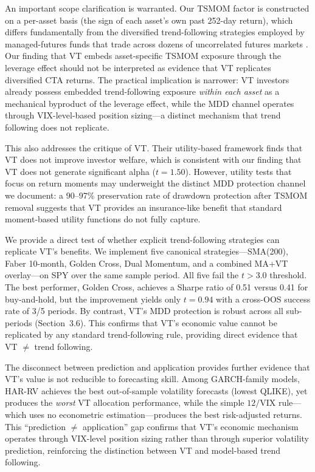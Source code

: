 An important scope clarification is warranted. Our TSMOM factor is constructed on a per-asset basis (the sign of each asset's own past 252-day return), which differs fundamentally from the diversified trend-following strategies employed by managed-futures funds that trade across dozens of uncorrelated futures markets \citep{moskowitz2012}. Our finding that VT embeds asset-specific TSMOM exposure through the leverage effect should not be interpreted as evidence that VT replicates diversified CTA returns. The practical implication is narrower: VT investors already possess embedded trend-following exposure \textit{within each asset} as a mechanical byproduct of the leverage effect, while the MDD channel operates through VIX-level-based position sizing---a distinct mechanism that trend following does not replicate.

This also addresses the \citet{cederburg2020} critique of VT. Their utility-based framework finds that VT does not improve investor welfare, which is consistent with our finding that VT does not generate significant alpha ($t = 1.50$). However, utility tests that focus on return moments may underweight the distinct MDD protection channel we document: a 90--97\% preservation rate of drawdown protection after TSMOM removal suggests that VT provides an insurance-like benefit that standard moment-based utility functions do not fully capture.

We provide a direct test of whether explicit trend-following strategies can replicate VT's benefits. We implement five canonical strategies---SMA(200), Faber 10-month, Golden Cross, Dual Momentum, and a combined MA+VT overlay---on SPY over the same sample period. All five fail the \citet{harvey2016} $t > 3.0$ threshold. The best performer, Golden Cross, achieves a Sharpe ratio of 0.51 versus 0.41 for buy-and-hold, but the improvement yields only $t = 0.94$ with a cross-OOS success rate of 3/5 periods. By contrast, VT's MDD protection is robust across all sub-periods (Section~3.6). This confirms that VT's economic value cannot be replicated by any standard trend-following rule, providing direct evidence that VT $\neq$ trend following.

The disconnect between prediction and application provides further evidence that VT's value is not reducible to forecasting skill. Among GARCH-family models, HAR-RV achieves the best out-of-sample volatility forecasts (lowest QLIKE), yet produces the \textit{worst} VT allocation performance, while the simple $12/\text{VIX}$ rule---which uses no econometric estimation---produces the best risk-adjusted returns. This ``prediction $\neq$ application'' gap confirms that VT's economic mechanism operates through VIX-level position sizing rather than through superior volatility prediction, reinforcing the distinction between VT and model-based trend following.


